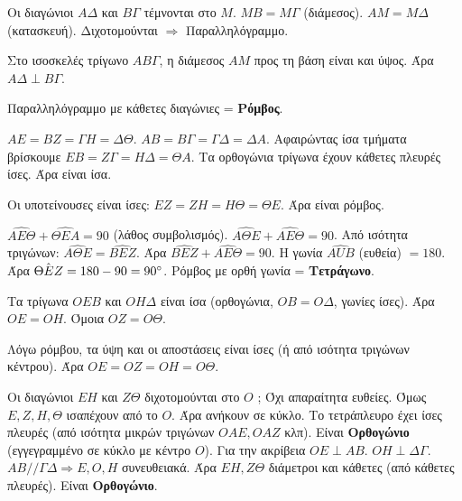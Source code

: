 \documentclass[11pt,a4paper,modern]{FFExercises}
\begin{document}
\begin{alist}
    \item Οι διαγώνιοι $A\Delta$ και $B\varGamma$ τέμνονται στο $M$. $MB=M\varGamma$ (διάμεσος). $AM=M\Delta$ (κατασκευή). Διχοτομούνται $\Rightarrow$ Παραλληλόγραμμο.
    \item Στο ισοσκελές τρίγωνο $AB\varGamma$, η διάμεσος $AM$ προς τη βάση είναι και ύψος. Άρα $A\Delta \perp B\varGamma$.
    \item Παραλληλόγραμμο με κάθετες διαγώνιες = \textbf{Ρόμβος}.
\end{alist}

\begin{alist}
    \item $AE=BZ=\varGamma H=\Delta \Theta$. $AB=B\varGamma=\varGamma\Delta=\Delta A$. Αφαιρώντας ίσα τμήματα βρίσκουμε $EB=Z\varGamma=H\Delta=\Theta A$.
    Τα ορθογώνια τρίγωνα έχουν κάθετες πλευρές ίσες. Άρα είναι ίσα.
    \item Οι υποτείνουσες είναι ίσες: $EZ=ZH=H\Theta=\Theta E$. Άρα είναι ρόμβος.
    \item $\hat{AE\Theta} + \hat{\Theta E A} = 90$ (λάθος συμβολισμός). $\hat{A\Theta E} + \hat{AE\Theta} = 90$.
    Από ισότητα τριγώνων: $\hat{A\Theta E} = \hat{BEZ}$.
    Άρα $\hat{BEZ} + \hat{AE\Theta} = 90$.
    Η γωνία $\hat{AUB}$ (ευθεία) $= 180$. Άρα $\hat{\Theta E Z} = 180 - 90 = 90\degree$.
    Ρόμβος με ορθή γωνία = \textbf{Τετράγωνο}.
\end{alist}

\begin{alist}
    \item Τα τρίγωνα $OEB$ και $OH\Delta$ είναι ίσα (ορθογώνια, $OB=O\Delta$, γωνίες ίσες). Άρα $OE=OH$. Όμοια $OZ=O\Theta$.
    \item Λόγω ρόμβου, τα ύψη και οι αποστάσεις είναι ίσες (ή από ισότητα τριγώνων κέντρου). Άρα $OE=OZ=OH=O\Theta$.
    \item Οι διαγώνιοι $EH$ και $Z\Theta$ διχοτομούνται στο $O$ ; Όχι απαραίτητα ευθείες.
    Όμως $E, Z, H, \Theta$ ισαπέχουν από το $O$. Άρα ανήκουν σε κύκλο.
    Το τετράπλευρο έχει ίσες πλευρές (από ισότητα μικρών τριγώνων $OAE, OAZ$ κλπ).
    Είναι \textbf{Ορθογώνιο} (εγγεγραμμένο σε κύκλο με κέντρο $O$).
    Για την ακρίβεια $OE \perp AB$. $OH \perp \Delta\varGamma$. $AB // \varGamma\Delta \Rightarrow E, O, H$ συνευθειακά.
    Άρα $EH, Z\Theta$ διάμετροι και κάθετες (από κάθετες πλευρές).
    Είναι \textbf{Ορθογώνιο}.
\end{alist}
\end{document}
